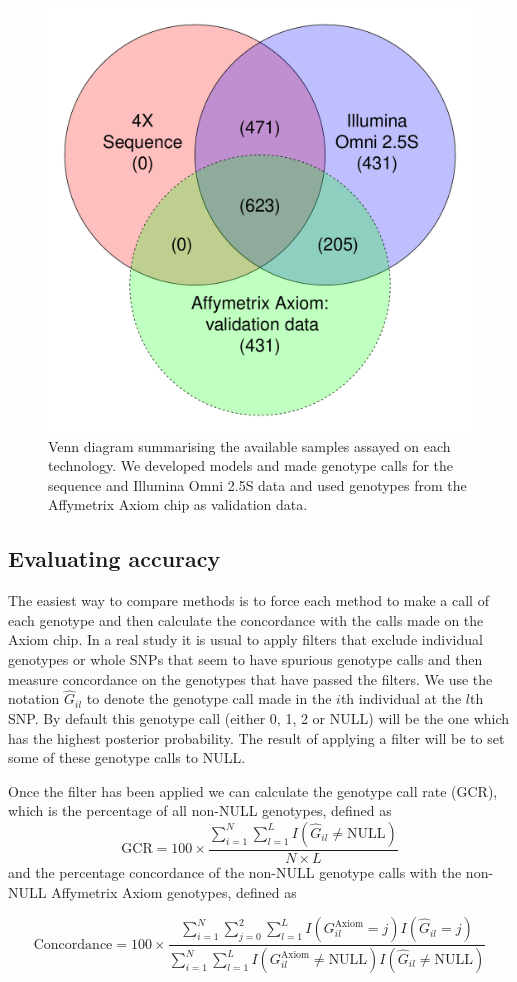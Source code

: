\begin{figure}
\centering
    \includegraphics[width=.4\textwidth]{chap2figs/venn}
    \caption[The available samples assayed on each genotyping technology]{Venn diagram summarising the available samples assayed on each technology.  We developed models and made genotype calls for the sequence and Illumina Omni 2.5S data and used genotypes from the Affymetrix Axiom chip as validation data.  \label{venn} }
\end{figure}


\subsection{Evaluating accuracy}
The easiest way to compare methods is to force each method to make a call of each genotype and then calculate the concordance with the calls made on the Axiom chip. In a real study it is usual to apply filters that exclude individual genotypes or whole SNPs that seem to have spurious genotype calls and then measure concordance on the genotypes that have passed the filters. We use the notation $\hat{G}_{il}$ to denote the genotype call made in the $i$th individual at the $l$th SNP. By default this genotype call (either 0, 1, 2 or NULL) will be the one which has the highest posterior probability. The result of applying a filter will be to set some of these genotype calls to NULL.

Once the filter has been applied we can calculate the genotype call rate (GCR), which is the percentage of all non-NULL genotypes, defined as 
\begin{equation}
\textrm{GCR} = 100 \times \frac{\sum_{i=1}^N \sum_{l=1}^L I(\hat{G}_{il}\neq \textrm{NULL})}{N \times L}
\end{equation}
and the percentage concordance of the non-NULL genotype calls with the non-NULL Affymetrix Axiom genotypes, defined as 

\begin{equation}
\textrm{Concordance} = 100 \times \frac{ \sum_{i=1}^N \sum_{j=0}^2 \sum_{l=1}^L I(G_{il}^{\textrm{Axiom}} = j) I(\hat{G}_{il}=j)}{\sum_{i=1}^N \sum_{l=1}^L I(G_{il}^{\textrm{Axiom}}\neq \textrm{NULL}) I(\hat{G}_{il}\neq \textrm{NULL}) } \label{concordance}
\end{equation}

